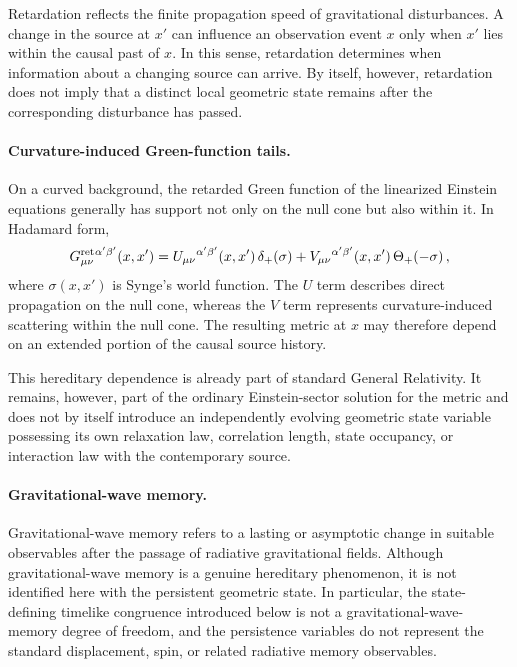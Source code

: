 Retardation reflects the finite propagation speed of gravitational
disturbances. A change in the source at $x'$ can influence an observation event
$x$ only when $x'$ lies within the causal past of $x$. In this sense,
retardation determines when information about a changing source can arrive. By
itself, however, retardation does not imply that a distinct local geometric
state remains after the corresponding disturbance has passed.

\paragraph{Curvature-induced Green-function tails.}

On a curved background, the retarded Green function of the linearized Einstein
equations generally has support not only on the null cone but also within it.
In Hadamard form,
\begin{equation}
    G^{\rm ret}_{\mu\nu}{}^{\alpha'\beta'}(x,x')
    =
    U_{\mu\nu}{}^{\alpha'\beta'}(x,x')\,
    \delta_{+}\!\left(\sigma\right)
    +
    V_{\mu\nu}{}^{\alpha'\beta'}(x,x')\,
    \Theta_{+}\!\left(-\sigma\right),
    \label{eq:gr-hadamard-distinction}
\end{equation}
where $\sigma(x,x')$ is Synge's world function. The $U$ term describes direct
propagation on the null cone, whereas the $V$ term represents curvature-induced
scattering within the null cone. The resulting metric at $x$ may therefore
depend on an extended portion of the causal source history.

This hereditary dependence is already part of standard General Relativity. It
remains, however, part of the ordinary Einstein-sector solution for the metric
and does not by itself introduce an independently evolving geometric state
variable possessing its own relaxation law, correlation length, state
occupancy, or interaction law with the contemporary source.

\paragraph{Gravitational-wave memory.}

Gravitational-wave memory refers to a lasting or asymptotic change in suitable
observables after the passage of radiative gravitational fields. Although
gravitational-wave memory is a genuine hereditary phenomenon, it is not
identified here with the persistent geometric state. In particular, the
state-defining timelike congruence introduced below is not a
gravitational-wave-memory degree of freedom, and the persistence variables do
not represent the standard displacement, spin, or related radiative memory
observables.

